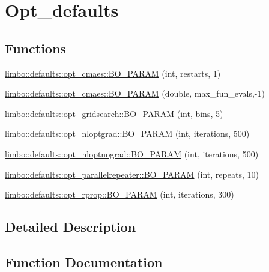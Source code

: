 \hypertarget{group__opt__defaults}{}\section{Opt\+\_\+defaults}
\label{group__opt__defaults}
\subsection*{Functions}
\begin{DoxyCompactItemize}
\item 
\hyperlink{group__opt__defaults_gaba7127b5e591a72095bd6c3a4155828d}{limbo\+::defaults\+::opt\+\_\+cmaes\+::\+B\+O\+\_\+\+P\+A\+R\+A\+M} (int, restarts, 1)
\item 
\hyperlink{group__opt__defaults_ga5130bd236acff913c59380059474ebab}{limbo\+::defaults\+::opt\+\_\+cmaes\+::\+B\+O\+\_\+\+P\+A\+R\+A\+M} (double, max\+\_\+fun\+\_\+evals,-\/1)
\item 
\hyperlink{group__opt__defaults_ga0ce56e9b25771d8a1b381b6ec132b8fe}{limbo\+::defaults\+::opt\+\_\+gridsearch\+::\+B\+O\+\_\+\+P\+A\+R\+A\+M} (int, bins, 5)
\item 
\hyperlink{group__opt__defaults_ga4b0e251e3b7440148225201bcfc61f26}{limbo\+::defaults\+::opt\+\_\+nloptgrad\+::\+B\+O\+\_\+\+P\+A\+R\+A\+M} (int, iterations, 500)
\item 
\hyperlink{group__opt__defaults_gae76755c949c322e0a8a33806c811b6f2}{limbo\+::defaults\+::opt\+\_\+nloptnograd\+::\+B\+O\+\_\+\+P\+A\+R\+A\+M} (int, iterations, 500)
\item 
\hyperlink{group__opt__defaults_ga4dfaebabf04a129cbb565807ed31f2de}{limbo\+::defaults\+::opt\+\_\+parallelrepeater\+::\+B\+O\+\_\+\+P\+A\+R\+A\+M} (int, repeats, 10)
\item 
\hyperlink{group__opt__defaults_gadf6a8058cda20130ad992631e561eb5a}{limbo\+::defaults\+::opt\+\_\+rprop\+::\+B\+O\+\_\+\+P\+A\+R\+A\+M} (int, iterations, 300)
\end{DoxyCompactItemize}


\subsection{Detailed Description}


\subsection{Function Documentation}
\hypertarget{group__opt__defaults_ga0ce56e9b25771d8a1b381b6ec132b8fe}{}
